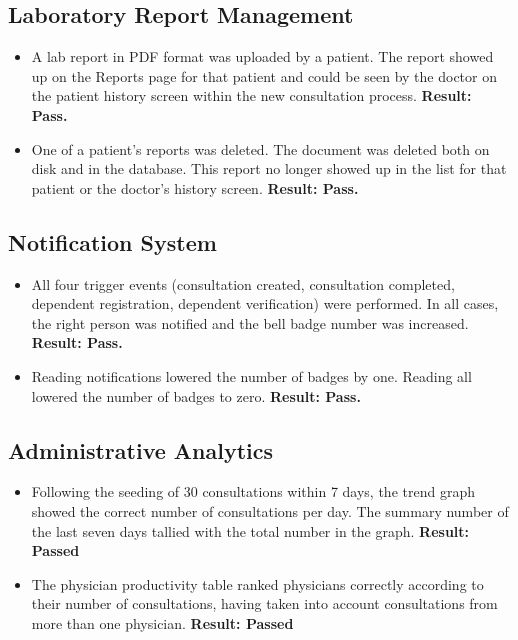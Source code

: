 \subsection{Laboratory Report Management}

\begin{itemize}
  \item A lab report in PDF format was uploaded by a patient. The
  report showed up on the Reports page for that patient and could be
  seen by the doctor on the patient history screen within the new
  consultation process. \textbf{Result: Pass.}

  \item One of a patient’s reports was deleted. The document was
  deleted both on disk and in the database. This report no longer
  showed up in the list for that patient or the doctor’s history
  screen. \textbf{Result: Pass.}
\end{itemize}

\subsection{Notification System}

\begin{itemize}
  \item All four trigger events (consultation created, consultation
  completed, dependent registration, dependent verification) were
  performed. In all cases, the right person was notified and the
  bell badge number was increased. \textbf{Result: Pass.}

  \item Reading notifications lowered the number of badges by one.
  Reading all lowered the number of badges to zero.
  \textbf{Result: Pass.}
\end{itemize}

\subsection{Administrative Analytics}

\begin{itemize}
  \item Following the seeding of 30 consultations within 7 days, the trend graph showed the correct number of consultations per day. The summary number of the last seven days tallied with the total number in the graph. \textbf{Result: Passed}

  \item The physician productivity table ranked physicians correctly according to their number of consultations, having taken into account consultations from more than one physician. \textbf{Result: Passed}
\end{itemize}

